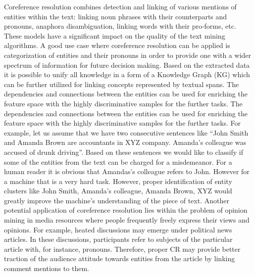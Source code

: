 Coreference resolution combines detection and linking of various mentions of entities within the text: linking noun phrases with their counterparts and pronouns, anaphora disambiguation, linking words with their pro-forms, etc.  
These models have a significant impact on the quality of the text mining algorithms. 
A good use case where  coreference resolution can be applied is categorization of entities and their pronouns in order to provide one with a wider spectrum of information for future decision making. Based on the extracted data it is possible to unify all knowledge in a form of a Knowledge Graph (KG) \cite{kg-Wang2017} which can be further utilized for linking concepts represented by textual spans. The dependencies and connections between the entities can be used for enriching the feature space with the highly discriminative samples for the further tasks. 
The dependencies and connections between the entities can be used for enriching the feature space with the highly discriminative samples for the further tasks. 
For example, let us assume that we have two consecutive sentences like “John Smith and Amanda Brown are accountants in XYZ company. Amanda’s colleague was accused of drunk driving”. Based on these sentences we would like to classify if some of the entities from the text can be charged for a misdemeanor. 
For a human reader it is obvious that Amandas’s colleague refers to John. However for a machine that is a very hard task. However, proper identification of entity clusters like {John Smith, Amanda’s colleague}, {Amanda Brown}, {XYZ} would greatly improve the machine’s understanding of the piece of text.
Another potential application of coreference resolution lies within the problem of opinion mining in media resources where people frequently freely express their views and opinions.
For example, heated discussions may emerge under political news articles. In these discussions, participants refer to subjects of the particular article with, for instance, pronouns. Therefore, proper CR may provide better traction of the audience attitude towards entities from the article by linking comment mentions to them.  


